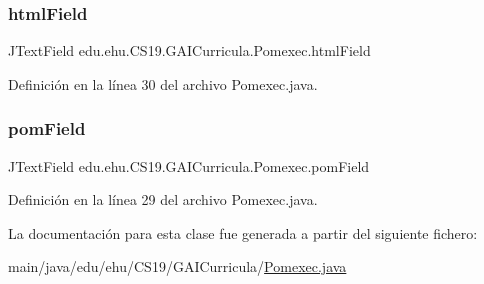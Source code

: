 \subsubsection{\texorpdfstring{htmlField}{htmlField}}
{\footnotesize\ttfamily J\+Text\+Field edu.\+ehu.\+C\+S19.\+G\+A\+I\+Curricula.\+Pomexec.\+html\+Field\hspace{0.3cm}{\ttfamily [private]}}



Definición en la línea 30 del archivo Pomexec.\+java.

\mbox{\label{classedu_1_1ehu_1_1_c_s19_1_1_g_a_i_curricula_1_1_pomexec_a7ea71ef0b61fa8df0b1689d11ce167cf}} 
\subsubsection{\texorpdfstring{pomField}{pomField}}
{\footnotesize\ttfamily J\+Text\+Field edu.\+ehu.\+C\+S19.\+G\+A\+I\+Curricula.\+Pomexec.\+pom\+Field\hspace{0.3cm}{\ttfamily [private]}}



Definición en la línea 29 del archivo Pomexec.\+java.



La documentación para esta clase fue generada a partir del siguiente fichero\+:\begin{DoxyCompactItemize}
\item 
main/java/edu/ehu/\+C\+S19/\+G\+A\+I\+Curricula/\mbox{\hyperlink{_pomexec_8java}{Pomexec.\+java}}\end{DoxyCompactItemize}

